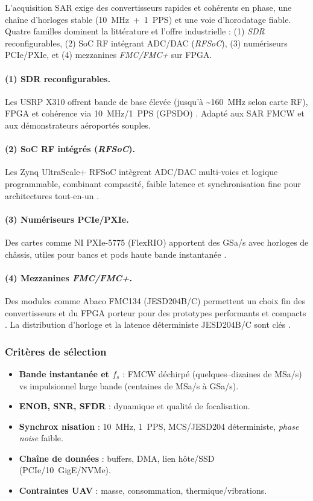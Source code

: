 L’acquisition SAR exige des convertisseurs rapides et cohérents en phase, une chaîne d’horloges stable (10~MHz~+~1~PPS) et une voie d’horodatage fiable. Quatre familles dominent la littérature et l’offre industrielle : (1) \textit{SDR} reconfigurables, (2) SoC RF intégrant ADC/DAC (\textit{RFSoC}), (3) numériseurs PCIe/PXIe, et (4) mezzanines \textit{FMC/FMC+} sur FPGA.

\paragraph{(1) SDR reconfigurables.}
Les USRP X310 offrent bande de base élevée (jusqu’à \textasciitilde160~MHz selon carte RF), FPGA et cohérence via 10~MHz/1~PPS (GPSDO) \cite{Ettus_X310_Spec}. Adapté aux SAR FMCW et aux démonstrateurs aéroportés souples.

\paragraph{(2) SoC RF intégrés (\textit{RFSoC}).}
Les Zynq UltraScale+ RFSoC intègrent ADC/DAC multi-voies et logique programmable, combinant compacité, faible latence et synchronisation fine pour architectures tout-en-un \cite{AMD_RFSoC_DS889}.

\paragraph{(3) Numériseurs PCIe/PXIe.}
Des cartes comme NI PXIe-5775 (FlexRIO) apportent des GSa/s avec horloges de châssis, utiles pour bancs et pods haute bande instantanée \cite{NI_PXIe5775_Spec}.

\paragraph{(4) Mezzanines \textit{FMC/FMC+}.}
Des modules comme Abaco FMC134 (JESD204B/C) permettent un choix fin des convertisseurs et du FPGA porteur pour des prototypes performants et compacts \cite{Abaco_FMC134}. La distribution d’horloge et la latence déterministe JESD204B/C sont clés \cite{ADI_JESD204B_Survival}.

\subsubsection*{Critères de sélection}
\begin{itemize}
  \item \textbf{Bande instantanée et $f_s$} : FMCW déchirpé (quelques--dizaines de MSa/s) vs impulsionnel large bande (centaines de MSa/s à GSa/s).
  \item \textbf{ENOB, SNR, SFDR} : dynamique et qualité de focalisation.
  \item \textbf{Synchrox    nisation} : 10~MHz, 1~PPS, MCS/JESD204 déterministe, \textit{phase noise} faible.
  \item \textbf{Chaîne de données} : buffers, DMA, lien hôte/SSD (PCIe/10~GigE/NVMe).
  \item \textbf{Contraintes UAV} : masse, consommation, thermique/vibrations.
\end{itemize}
